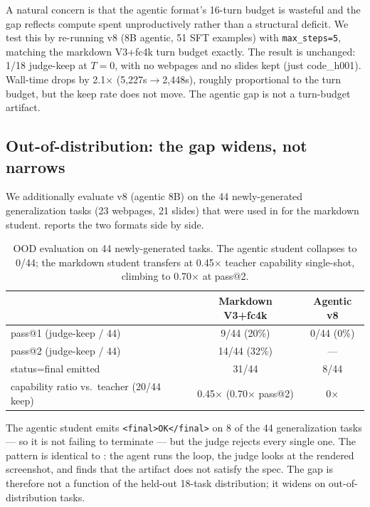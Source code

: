\documentclass[11pt]{article}
\begin{document}
A natural concern is that the agentic format's 16-turn budget is wasteful and the gap reflects compute spent unproductively rather than a structural deficit. We test this by re-running v8 (8B agentic, 51 SFT examples) with \texttt{max\_steps=5}, matching the markdown V3+fc4k turn budget exactly. The result is unchanged: 1/18 judge-keep at $T{=}0$, with no webpages and no slides kept (just code\_h001). Wall-time drops by 2.1$\times$ (5{,}227s$\to$2{,}448s), roughly proportional to the turn budget, but the keep rate does not move. The agentic gap is not a turn-budget artifact.

\subsection{Out-of-distribution: the gap widens, not narrows}
\label{sec:ood}

We additionally evaluate v8 (agentic 8B) on the 44 newly-generated generalization tasks (23 webpages, 21 slides) that were used in  for the markdown student.  reports the two formats side by side.

\begin{table}[ht]
\centering
\caption{OOD evaluation on 44 newly-generated tasks. The agentic student collapses to 0/44; the markdown student transfers at 0.45$\times$ teacher capability single-shot, climbing to 0.70$\times$ at pass@2.}
\label{tab:ood-comparison}
\begin{tabular}{lcc}
\toprule
& Markdown V3+fc4k & Agentic v8 \\
\midrule
pass@1 (judge-keep / 44) & 9/44 (20\%) & 0/44 (0\%) \\
pass@2 (judge-keep / 44) & 14/44 (32\%) & --- \\
status=final emitted & 31/44 & 8/44 \\
capability ratio vs.\ teacher (20/44 keep) & 0.45$\times$ (0.70$\times$ pass@2) & 0$\times$ \\
\bottomrule
\end{tabular}
\end{table}

The agentic student emits \texttt{<final>OK</final>} on 8 of the 44 generalization tasks --- so it is not failing to terminate --- but the judge rejects every single one. The pattern is identical to : the agent runs the loop, the judge looks at the rendered screenshot, and finds that the artifact does not satisfy the spec. The gap is therefore not a function of the held-out 18-task distribution; it widens on out-of-distribution tasks.
\end{document}
